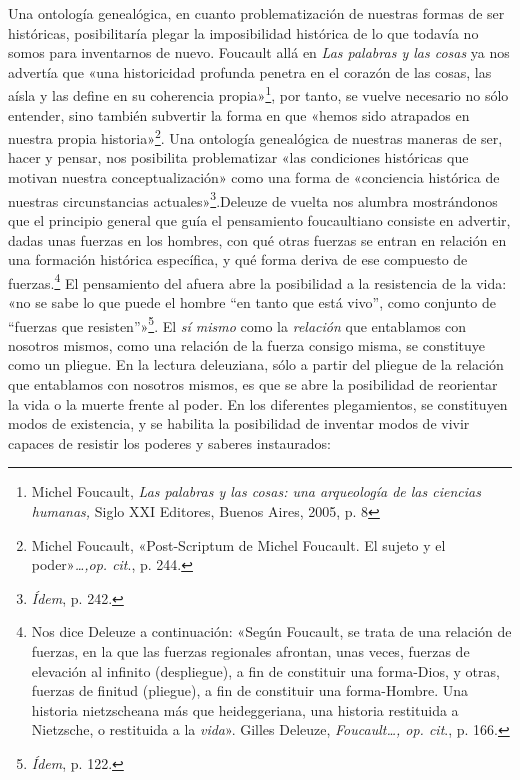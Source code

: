 Una ontología genealógica, en cuanto problematización de nuestras formas de ser históricas, posibilitaría plegar la imposibilidad histórica de lo que todavía no somos para inventarnos de nuevo. Foucault allá en \emph{Las palabras y las cosas} ya nos advertía que «una historicidad profunda penetra en el corazón de las cosas, las aísla y las define en su coherencia propia»\footnote{Michel Foucault, \emph{Las palabras y las cosas: una arqueología de las ciencias humanas,} Siglo XXI Editores, Buenos Aires, 2005, p. 8}, por tanto, se vuelve necesario no sólo entender, sino también subvertir la forma en que «hemos sido atrapados en nuestra propia historia»\footnote{Michel Foucault, «Post-Scriptum de Michel Foucault. El sujeto y el poder»\emph{\ldots,op. cit}., p. 244.}. Una ontología genealógica de nuestras maneras de ser, hacer y pensar, nos posibilita problematizar «las condiciones históricas que motivan nuestra conceptualización» como una forma de «conciencia histórica de nuestras circunstancias actuales»\footnote{\emph{Ídem}, p. 242.}.Deleuze de vuelta nos alumbra mostrándonos que el principio general que guía el pensamiento foucaultiano consiste en advertir, dadas unas fuerzas en los hombres, con qué otras fuerzas se entran en relación en una formación histórica específica, y qué forma deriva de ese compuesto de fuerzas.\footnote{Nos dice Deleuze a continuación: «Según Foucault, se trata de una relación de fuerzas, en la que las fuerzas regionales afrontan, unas veces, fuerzas de elevación al infinito (despliegue), a fin de constituir una forma-Dios, y otras, fuerzas de finitud (pliegue), a fin de constituir una forma-Hombre. Una historia nietzscheana más que heideggeriana, una historia restituida a Nietzsche, o restituida a la \emph{vida}». Gilles Deleuze, \emph{Foucault\ldots, op. cit}., p. 166.} El pensamiento del afuera abre la posibilidad a la resistencia de la vida: «no se sabe lo que puede el hombre ``en tanto que está vivo'', como conjunto de ``fuerzas que resisten''»\footnote{\emph{Ídem}, p. 122.}. El \emph{sí mismo} como la \emph{relación} que entablamos con nosotros mismos, como una relación de la fuerza consigo misma, se constituye como un pliegue. En la lectura deleuziana, sólo a partir del pliegue de la relación que entablamos con nosotros mismos, es que se abre la posibilidad de reorientar la vida o la muerte frente al poder. En los diferentes plegamientos, se constituyen modos de existencia, y se habilita la posibilidad de inventar modos de vivir capaces de resistir los poderes y saberes instaurados:

